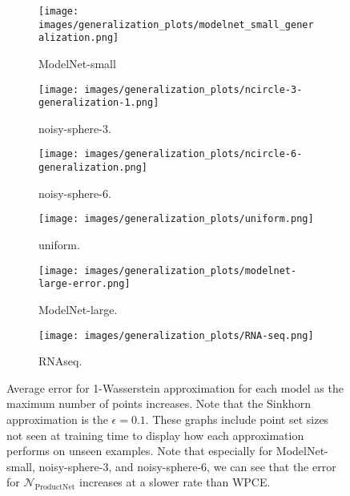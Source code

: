 \documentclass[12pt]{article}
\newcommand{\Network}{\mathcal{N}_{\mathrm{ProductNet}}}
\begin{document}
\begin{figure}
     \centering
     \begin{subfigure}[b]{0.3\textwidth}
         \centering
         \texttt{[image: images/generalization\_plots/modelnet\_small\_generalization.png]}
         \caption{ModelNet-small}
         \label{fig:y equals x}
     \end{subfigure}
     \hfill
     \begin{subfigure}[b]{0.3\textwidth}
         \centering
         \texttt{[image: images/generalization\_plots/ncircle-3-generalization-1.png]}
         \caption{noisy-sphere-3.}
         \label{fig:nsphere3}
     \end{subfigure}
     \hfill
     \begin{subfigure}[b]{0.3\textwidth}
         \centering
         \texttt{[image: images/generalization\_plots/ncircle-6-generalization.png]}
         \caption{noisy-sphere-6.}
         \label{fig:nsphere6}
     \end{subfigure}
     \hspace*{\fill}%
     \begin{subfigure}[b]{0.3\textwidth}
         \centering
         \texttt{[image: images/generalization\_plots/uniform.png]}
         \caption{uniform.}
         \label{fig:uniform}
     \end{subfigure}
     \hfill
     \begin{subfigure}[b]{0.3\textwidth}
         \centering
         \texttt{[image: images/generalization\_plots/modelnet-large-error.png]}
         \caption{ModelNet-large.}
         \label{fig:modelnetlarge}
     \end{subfigure}
     \hfill
     \hfill
     \begin{subfigure}[b]{0.3\textwidth}
         \centering
         \texttt{[image: images/generalization\_plots/RNA-seq.png]}
         \caption{RNAseq.}
         \label{fig:rnaseq}
     \end{subfigure}
     \hfill
     \hspace*{\fill}%
        \caption{Average error for 1-Wasserstein approximation for each model as the maximum number of points increases. Note that the Sinkhorn approximation is the $\epsilon = 0.1$. These graphs include point set sizes not seen at training time to display how each approximation performs on unseen examples. Note that especially for ModelNet-small, noisy-sphere-3, and noisy-sphere-6, we can see that the error for $\Network$ increases at a slower rate than WPCE.}
        \label{fig:generalization-w2}
\end{figure}
\end{document}
